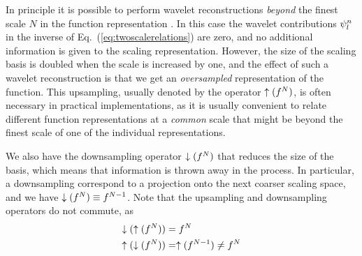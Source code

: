 In principle it is possible to perform wavelet reconstructions \emph{beyond} the
finest scale $N$ in the function representation . In this case
the wavelet contributions $\psi_l^n$ in the inverse of 
Eq.~(\ref{eq:twoscalerelations}) are zero, and no additional information is
given to the scaling representation. However, the size of the scaling basis is 
doubled when the scale is increased by one, and the effect of such a wavelet 
reconstruction is that we get an \emph{oversampled} representation of the 
function. This upsampling, usually denoted by the operator 
$\uparrow({f}^{N})$, is often necessary in practical implementations, 
as it is usually convenient to relate different function representations at a 
\emph{common} scale that might be beyond the finest scale of one of the individual 
representations.

We also have the downsampling operator $\downarrow({f}^{N})$ that reduces
the size of the basis, which means that information is thrown away in the process.
In particular, a downsampling correspond to a projection onto the next coarser
scaling space, and we have $\downarrow({f}^{N}) \equiv {f}^{N-1}$.
Note that the upsampling and downsampling operators do not commute, as
\begin{align}
    \downarrow(\uparrow({f}^{N})) &= {f}^{N}\\ 
    \uparrow(\downarrow({f}^{N})) &= \uparrow({f}^{N-1}) 
	\neq {f}^{N}
\end{align}

